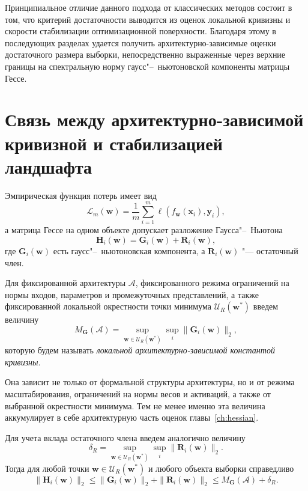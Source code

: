 Принципиальное отличие данного подхода от классических методов состоит в том, что критерий достаточности выводится из оценок локальной кривизны и скорости стабилизации оптимизационной поверхности. Благодаря этому в последующих разделах удается получить архитектурно-зависимые оценки достаточного размера выборки, непосредственно выраженные через верхние границы на спектральную норму гаусс"--~ньютоновской компоненты матрицы Гессе.

\section{Связь между архитектурно-зависимой кривизной и стабилизацией ландшафта}

Эмпирическая функция потерь имеет вид
\begin{equation}
    \mathcal L_m(\mathbf w)
    =
    \frac{1}{m}\sum_{i=1}^m \ell(f_{\mathbf w}(\mathbf x_i), \mathbf y_i),
\end{equation}
а матрица Гессе на одном объекте допускает разложение Гаусса"--~Ньютона
\begin{equation}
    \mathbf H_i(\mathbf w)
    =
    \mathbf G_i(\mathbf w)+\mathbf R_i(\mathbf w),
\end{equation}
где $\mathbf G_i(\mathbf w)$ есть гаусс"--~ньютоновская компонента, а $\mathbf R_i(\mathbf w)$ "--- остаточный член.

Для фиксированной архитектуры $\mathcal A$, фиксированного режима ограничений на нормы входов, параметров и промежуточных представлений, а также фиксированной локальной окрестности точки минимума $\mathcal U_R(\mathbf w^*)$ введем величину
\begin{equation}
    \label{eq:scaling-MG-def}
    M_{\mathbf G}(\mathcal A)
    =
    \sup_{\mathbf w \in \mathcal U_R(\mathbf w^*)}
    \sup_i
    \|\mathbf G_i(\mathbf w)\|_2,
\end{equation}
которую будем называть \emph{локальной архитектурно-зависимой константой кривизны}.

Она зависит не только от формальной структуры архитектуры, но и от режима масштабирования, ограничений на нормы весов и активаций, а также от выбранной окрестности минимума. Тем не менее именно эта величина аккумулирует в себе архитектурную часть оценок главы~\ref{ch:hessian}.

Для учета вклада остаточного члена введем аналогично величину
\begin{equation}
    \label{eq:scaling-deltaR}
    \delta_R
    =
    \sup_{\mathbf w \in \mathcal U_R(\mathbf w^*)}
    \sup_i
    \|\mathbf R_i(\mathbf w)\|_2.
\end{equation}
Тогда для любой точки $\mathbf w \in \mathcal U_R(\mathbf w^*)$ и любого объекта выборки справедливо
\begin{equation}
    \label{eq:scaling-MH-MG}
    \|\mathbf H_i(\mathbf w)\|_2
    \le
    \|\mathbf G_i(\mathbf w)\|_2+\|\mathbf R_i(\mathbf w)\|_2
    \le
    M_{\mathbf G}(\mathcal A)+\delta_R.
\end{equation}


